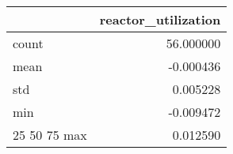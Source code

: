 \begin{tabular}{lr}
\toprule
 & reactor\_utilization \\
\midrule
count & 56.000000 \\
mean & -0.000436 \\
std & 0.005228 \\
min & -0.009472 \\
25%
50%
75%
max & 0.012590 \\
\bottomrule
\end{tabular}

